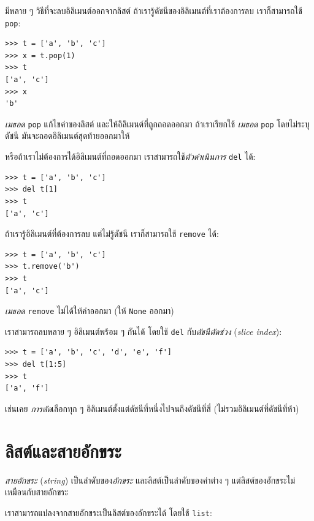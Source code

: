มีหลาย ๆ วิธีที่จะลบอิลิเมนต์ออกจากลิสต์
ถ้าเรารู้ดัชนีของอิลิเมนต์ที่เราต้องการลบ 
เราก็สามารถใช้
\texttt{pop}:

\begin{verbatim}
>>> t = ['a', 'b', 'c']
>>> x = t.pop(1)
>>> t
['a', 'c']
>>> x
'b'
\end{verbatim}
%
\textit{เมธอด} \texttt{pop} แก้ไขค่าของลิสต์ และให้อิลิเมนต์ที่ถูกถอดออกมา
ถ้าเราเรียกใช้ \textit{เมธอด} \texttt{pop} โดยไม่ระบุดัชนี
มันจะถอดอิลิเมนต์สุดท้ายออกมาให้

หรือถ้าเราไม่ต้องการได้อิลิเมนต์ที่ถอดออกมา เราสามารถใช้\textit{ตัวดำเนินการ} \texttt{del} ได้:

\begin{verbatim}
>>> t = ['a', 'b', 'c']
>>> del t[1]
>>> t
['a', 'c']
\end{verbatim}
%
ถ้าเรารู้อิลิเมนต์ที่ต้องการลบ แต่ไม่รู้ดัชนี
เราก็สามารถใช้ \texttt{remove} ได้:

\begin{verbatim}
>>> t = ['a', 'b', 'c']
>>> t.remove('b')
>>> t
['a', 'c']
\end{verbatim}
%
\textit{เมธอด} \texttt{remove} ไม่ได้ให้ค่าออกมา (ให้  \texttt{None} ออกมา)

เราสามารถลบหลาย ๆ อิลิเมนต์พร้อม ๆ กันได้ โดยใช้ \texttt{del} กับ\textit{ดัชนีตัดช่วง} (\textit{slice index}):

\begin{verbatim}
>>> t = ['a', 'b', 'c', 'd', 'e', 'f']
>>> del t[1:5]
>>> t
['a', 'f']
\end{verbatim}
%
เช่นเคย
\textit{การตัด}เลือกทุก ๆ อิลิเมนต์ตั้งแต่ดัชนีที่หนึ่งไปจนถึงดัชนีที่สี่ (ไม่รวมอิลิเมนต์ที่ดัชนีที่ห้า)


\section{ลิสต์และสายอักขระ}

\textit{สายอักขระ} (\textit{string}) เป็นลำดับของ\textit{อักขระ}
และลิสต์เป็นลำดับของค่าต่าง ๆ
แต่ลิสต์ของอักขระไม่เหมือนกับสายอักขระ

เราสามารถแปลงจากสายอักขระเป็นลิสต์ของอักขระได้ โดยใช้ \texttt{list}:

